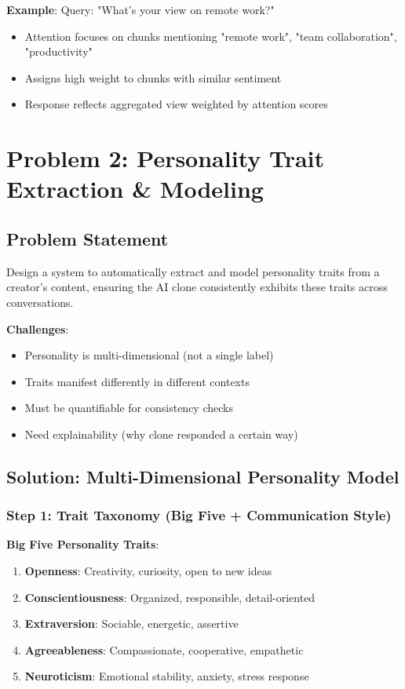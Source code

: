 \documentclass[10pt]{article}
\begin{document}
\textbf{Example}: Query: "What's your view on remote work?"
\begin{itemize}[leftmargin=*]
    \item Attention focuses on chunks mentioning "remote work", "team collaboration", "productivity"
    \item Assigns high weight to chunks with similar sentiment
    \item Response reflects aggregated view weighted by attention scores
\end{itemize}

\section{Problem 2: Personality Trait Extraction \& Modeling}

\subsection{Problem Statement}

Design a system to automatically extract and model personality traits from a creator's content, ensuring the AI clone consistently exhibits these traits across conversations.

\textbf{Challenges}:
\begin{itemize}[leftmargin=*]
    \item Personality is multi-dimensional (not a single label)
    \item Traits manifest differently in different contexts
    \item Must be quantifiable for consistency checks
    \item Need explainability (why clone responded a certain way)
\end{itemize}

\subsection{Solution: Multi-Dimensional Personality Model}

\subsubsection{Step 1: Trait Taxonomy (Big Five + Communication Style)}

\textbf{Big Five Personality Traits}:
\begin{enumerate}[leftmargin=*]
    \item \textbf{Openness}: Creativity, curiosity, open to new ideas
    \item \textbf{Conscientiousness}: Organized, responsible, detail-oriented
    \item \textbf{Extraversion}: Sociable, energetic, assertive
    \item \textbf{Agreeableness}: Compassionate, cooperative, empathetic
    \item \textbf{Neuroticism}: Emotional stability, anxiety, stress response
\end{enumerate}
\end{document}
